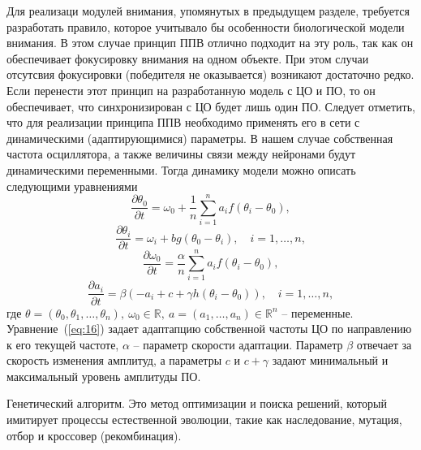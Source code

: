 \documentclass[14pt, russian]{scrartcl}
\begin{document}
Для реализаци модулей внимания, упомянутых в предыдущем разделе, требуется разработать правило, которое учитывало бы особенности биологической модели внимания. 
В этом случае принцип ППВ отлично подходит на эту роль, так как он обеспечивает фокусировку внимания на одном объекте. При этом случаи отсутсвия фокусировки (победителя не оказывается) возникают достаточно редко.
Если перенести этот принцип на разработанную модель с ЦО и ПО, то он обеспечивает, что синхронизирован с ЦО будет лишь один ПО. 
Следует отметить, что для реализации принципа ППВ необходимо применять его в сети с динамическими (адаптирующимися) параметры. В нашем случае собственная частота осциллятора, а также величины связи между нейронами будут динамическими переменными.
Тогда динамику модели можно описать следующими уравнениями
\begin{equation}\label{eq:14}
    \frac{\partial \theta_0}{\partial t} = \omega_0 + \frac{1}{n} \sum_{i = 1}^{n}a_i f(\theta_i - \theta_0),
\end{equation}
\begin{equation}\label{eq:15}
    \frac{\partial \theta_i}{\partial t} = \omega_i + b g(\theta_0 - \theta_i),\quad i = 1,\ldots,n,
\end{equation}
\begin{equation}\label{eq:16}
    \frac{\partial \omega_0}{\partial t} = \frac{\alpha}{n} \sum_{i = 1}^{n}a_i f(\theta_i - \theta_0),
\end{equation}
\begin{equation}\label{eq:17}
    \frac{\partial a_i}{\partial t} = \beta(-a_i + c + \gamma h(\theta_i - \theta_0)), \quad i = 1,\ldots,n,
\end{equation}где $\theta = (\theta_0, \theta_1, \ldots, \theta_n),\ \omega_0 \in \mathbb{R},\ a = (a_1, \ldots, a_n) \in \mathbb{R}^n$ -- переменные. Уравнение~(\ref{eq:16}) задает адаптапцию собственной частоты ЦО по направлению к его текущей частоте, $\alpha$ -- параметр скорости адаптации. Параметр $\beta$ отвечает за скорость изменения амплитуд, а параметры $c$ и $c + \gamma$ задают минимальный и максимальный уровень амплитуды ПО. 

Генетический алгоритм. Это метод оптимизации и поиска решений, который имитирует процессы естественной эволюции, такие как наследование, мутация, отбор и кроссовер (рекомбинация).
\end{document}
